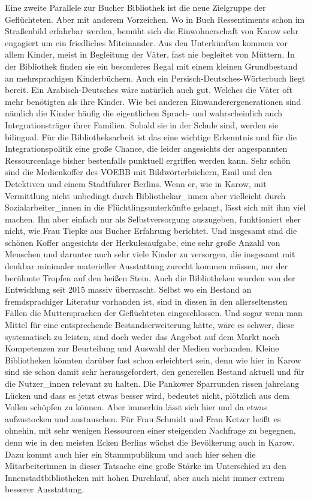 \documentclass[a4paper,
fontsize=11pt,
oneside,
numbers=noperiodatend,
parskip=half-,
bibliography=totoc,
final
]{scrartcl}
\begin{document}
Eine zweite Parallele zur Bucher Bibliothek ist die neue Zielgruppe der
Geflüchteten. Aber mit anderem Vorzeichen. Wo in Buch Ressentiments
schon im Straßenbild erfahrbar werden, bemüht sich die Einwohnerschaft
von Karow sehr engagiert um ein friedliches Miteinander. Aus den
Unterkünften kommen vor allem Kinder, meist in Begleitung der Väter,
fast nie begleitet von Müttern. In der Bibliothek finden sie ein
besonderes Regal mit einem kleinen Grundbestand an mehrsprachigen
Kinderbüchern. Auch ein Persisch-Deutsches-Wörterbuch liegt bereit. Ein
Arabisch-Deutsches wäre natürlich auch gut. Welches die Väter oft mehr
benötigten als ihre Kinder. Wie bei anderen Einwanderergenerationen sind
nämlich die Kinder häufig die eigentlichen Sprach- und wahrscheinlich
auch Integrationsträger ihrer Familien. Sobald sie in der Schule sind,
werden sie bilingual. Für die Bibliotheksarbeit ist das eine wichtige
Erkenntnis und für die Integrationspolitik eine große Chance, die leider
angesichts der angespannten Ressourcenlage bisher bestenfalls punktuell
ergriffen werden kann. Sehr schön sind die Medienkoffer des VOEBB mit
Bildwörterbüchern, Emil und den Detektiven und einem Stadtführer
Berlins. Wenn er, wie in Karow, mit Vermittlung nicht unbedingt durch
Bibliothekar\_innen aber vielleicht durch Sozialarbeiter\_innen in die
Flüchtlingsunterkünfte gelangt, lässt sich mit ihm viel machen. Ihn aber
einfach nur als Selbstversorgung auszugeben, funktioniert eher nicht,
wie Frau Tiepke aus Bucher Erfahrung berichtet. Und insgesamt sind die
schönen Koffer angesichts der Herkulesaufgabe, eine sehr große Anzahl
von Menschen und darunter auch sehr viele Kinder zu versorgen, die
insgesamt mit denkbar minimaler materieller Ausstattung zurecht kommen
müssen, nur der berühmte Tropfen auf den heißen Stein. Auch die
Bibliotheken wurden von der Entwicklung seit 2015 massiv überrascht.
Selbst wo ein Bestand an fremdsprachiger Literatur vorhanden ist, sind
in diesen in den allerseltensten Fällen die Muttersprachen der
Geflüchteten eingeschlossen. Und sogar wenn man Mittel für eine
entsprechende Bestandserweiterung hätte, wäre es schwer, diese
systematisch zu leisten, sind doch weder das Angebot auf dem Markt noch
Kompetenzen zur Beurteilung und Auswahl der Medien vorhanden. Kleine
Bibliotheken könnten darüber fast schon erleichtert sein, denn wie hier
in Karow sind sie schon damit sehr herausgefordert, den generellen
Bestand aktuell und für die Nutzer\_innen relevant zu halten. Die
Pankower Sparrunden rissen jahrelang Lücken und dass es jetzt etwas
besser wird, bedeutet nicht, plötzlich aus dem Vollen schöpfen zu
können. Aber immerhin lässt sich hier und da etwas aufzustocken und
austauschen. Für Frau Schmidt und Frau Ketzer heißt es ohnehin, mit sehr
wenigen Ressourcen einer steigenden Nachfrage zu begegnen, denn wie in
den meisten Ecken Berlins wächst die Bevölkerung auch in Karow. Dazu
kommt auch hier ein Stammpublikum und auch hier sehen die
Mitarbeiterinnen in dieser Tatsache eine große Stärke im Unterschied zu
den Innenstadtbibliotheken mit hohen Durchlauf, aber auch nicht immer
extrem besserer Ausstattung.
\end{document}
